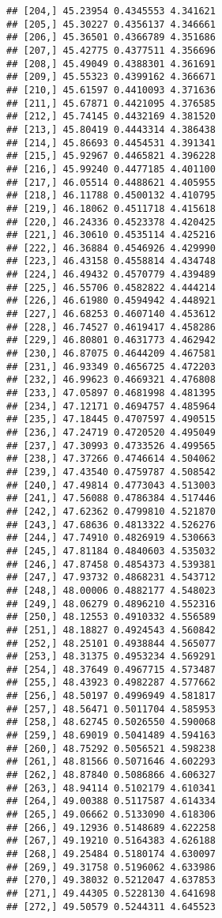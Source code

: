 \documentclass[]{book}
\theoremstyle{definition}
\theoremstyle{definition}
\theoremstyle{definition}
\theoremstyle{remark}
\begin{document}
\begin{verbatim}
## [204,] 45.23954 0.4345553 4.341621
## [205,] 45.30227 0.4356137 4.346661
## [206,] 45.36501 0.4366789 4.351686
## [207,] 45.42775 0.4377511 4.356696
## [208,] 45.49049 0.4388301 4.361691
## [209,] 45.55323 0.4399162 4.366671
## [210,] 45.61597 0.4410093 4.371636
## [211,] 45.67871 0.4421095 4.376585
## [212,] 45.74145 0.4432169 4.381520
## [213,] 45.80419 0.4443314 4.386438
## [214,] 45.86693 0.4454531 4.391341
## [215,] 45.92967 0.4465821 4.396228
## [216,] 45.99240 0.4477185 4.401100
## [217,] 46.05514 0.4488621 4.405955
## [218,] 46.11788 0.4500132 4.410795
## [219,] 46.18062 0.4511718 4.415618
## [220,] 46.24336 0.4523378 4.420425
## [221,] 46.30610 0.4535114 4.425216
## [222,] 46.36884 0.4546926 4.429990
## [223,] 46.43158 0.4558814 4.434748
## [224,] 46.49432 0.4570779 4.439489
## [225,] 46.55706 0.4582822 4.444214
## [226,] 46.61980 0.4594942 4.448921
## [227,] 46.68253 0.4607140 4.453612
## [228,] 46.74527 0.4619417 4.458286
## [229,] 46.80801 0.4631773 4.462942
## [230,] 46.87075 0.4644209 4.467581
## [231,] 46.93349 0.4656725 4.472203
## [232,] 46.99623 0.4669321 4.476808
## [233,] 47.05897 0.4681998 4.481395
## [234,] 47.12171 0.4694757 4.485964
## [235,] 47.18445 0.4707597 4.490515
## [236,] 47.24719 0.4720520 4.495049
## [237,] 47.30993 0.4733526 4.499565
## [238,] 47.37266 0.4746614 4.504062
## [239,] 47.43540 0.4759787 4.508542
## [240,] 47.49814 0.4773043 4.513003
## [241,] 47.56088 0.4786384 4.517446
## [242,] 47.62362 0.4799810 4.521870
## [243,] 47.68636 0.4813322 4.526276
## [244,] 47.74910 0.4826919 4.530663
## [245,] 47.81184 0.4840603 4.535032
## [246,] 47.87458 0.4854373 4.539381
## [247,] 47.93732 0.4868231 4.543712
## [248,] 48.00006 0.4882177 4.548023
## [249,] 48.06279 0.4896210 4.552316
## [250,] 48.12553 0.4910332 4.556589
## [251,] 48.18827 0.4924543 4.560842
## [252,] 48.25101 0.4938844 4.565077
## [253,] 48.31375 0.4953234 4.569291
## [254,] 48.37649 0.4967715 4.573487
## [255,] 48.43923 0.4982287 4.577662
## [256,] 48.50197 0.4996949 4.581817
## [257,] 48.56471 0.5011704 4.585953
## [258,] 48.62745 0.5026550 4.590068
## [259,] 48.69019 0.5041489 4.594163
## [260,] 48.75292 0.5056521 4.598238
## [261,] 48.81566 0.5071646 4.602293
## [262,] 48.87840 0.5086866 4.606327
## [263,] 48.94114 0.5102179 4.610341
## [264,] 49.00388 0.5117587 4.614334
## [265,] 49.06662 0.5133090 4.618306
## [266,] 49.12936 0.5148689 4.622258
## [267,] 49.19210 0.5164383 4.626188
## [268,] 49.25484 0.5180174 4.630097
## [269,] 49.31758 0.5196062 4.633986
## [270,] 49.38032 0.5212047 4.637853
## [271,] 49.44305 0.5228130 4.641698
## [272,] 49.50579 0.5244311 4.645523

\end{verbatim}
\end{document}
